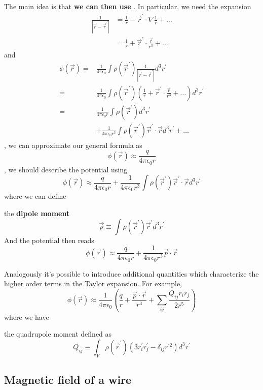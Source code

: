 The main idea is that \textbf{we can then use }. In particular, we need the expansion
\begin{equation}
\begin{aligned}
\frac{1}{\left|\vec{r}-\vec{r}^{\prime}\right|} &=\frac{1}{r}-\vec{r}^{\prime} \cdot \nabla \frac{1}{r}+\ldots \\
&=\frac{1}{r}+\vec{r}^{\prime} \cdot \frac{\vec{r}}{r^{3}}+\ldots
\end{aligned}
\end{equation}
and
\begin{equation}
\begin{aligned}
\phi(\vec{r})=& \frac{1}{4 \pi \epsilon_{0}} \int \rho\left(\vec{r}^{\prime}\right) \frac{1}{\left|\vec{r}-\vec{r}^{\prime}\right|} d^{3} r^{\prime} \\
=& \frac{1}{4 \pi \epsilon_{0}} \int \rho\left(\vec{r}^{\prime}\right)\left(\frac{1}{r}+\vec{r}^{\prime} \cdot \frac{\vec{r}}{r^{3}}+\ldots\right) d^{3} r^{\prime} \\
=& \frac{1}{4 \pi \epsilon_{0} r} \int \rho\left(\vec{r}^{\prime}\right) d^{3} r^{\prime} \\
&+\frac{1}{4 \pi \epsilon_{0} r^{3}} \int \rho\left(\vec{r}^{\prime}\right) \vec{r}^{\prime} \cdot \vec{r} d^{3} r^{\prime}+\ldots
\end{aligned}
\end{equation}
, we can approximate our general formula as
$$
\phi(\vec{r}) \approx \frac{q}{4 \pi \epsilon_{0} r}
$$
, we should describe the potential using
$$
\phi(\vec{r}) \approx \frac{q}{4 \pi \epsilon_{0} r}+\frac{1}{4 \pi \epsilon_{0} r^{3}} \int \rho\left(\vec{r}^{\prime}\right) \vec{r}^{\prime} \cdot \vec{r} d^{3} r^{\prime}
$$
where we can define
\begin{qt}
the \textbf{dipole moment}
\begin{equation}
\vec{p} \equiv \int \rho\left(\vec{r}^{\prime}\right) \vec{r}^{\prime} d^{3} r^{\prime}
\label{dipoleMoment}
\end{equation}
And the potential then reads
$$
\phi(\vec{r}) \approx \frac{q}{4 \pi \epsilon_{0} r}+\frac{1}{4 \pi \epsilon_{0} r^{3}} \vec{p} \cdot \vec{r}
$$
\end{qt}
Analogously it’s possible to introduce additional quantities which characterize the higher order terms in the Taylor expansion.
For example,
$$
\phi(\vec{r}) \approx \frac{1}{4 \pi \epsilon_{0}}\left(\frac{q}{r}+\frac{\vec{p} \cdot \vec{r}}{r^{3}}+\sum_{i j} \frac{Q_{i j} r_{i} r_{j}}{2 r^{5}}\right)
$$
where we have
\begin{qt}
the quadrupole moment defined as
\begin{equation}
Q_{i j} \equiv \int_{V} \rho\left(\vec{r}^{\prime}\right)\left(3 r_{i}^{\prime} r_{j}^{\prime}-\delta_{i j} r^{\prime 2}\right) d^{3} r^{\prime}
\label{quadrupoleMoment}
\end{equation}
\end{qt}

\subsection{Magnetic field of a wire}
